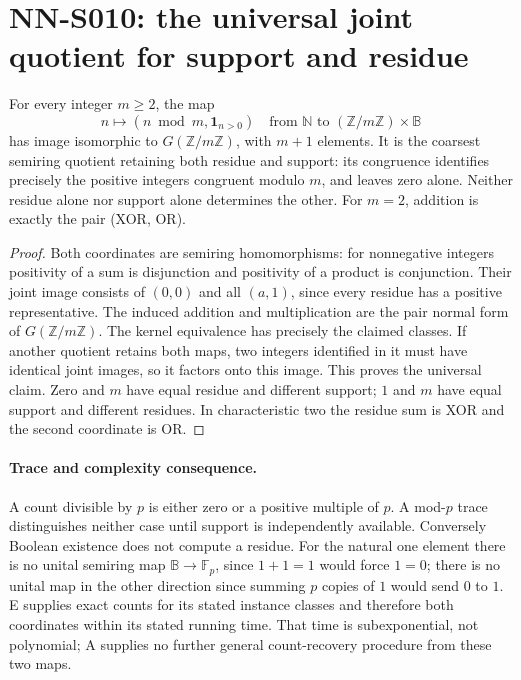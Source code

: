 \section{NN-S010: the universal joint quotient for support and residue}
\label{sec:NN-S010}

\begin{theorem}[NN-S010]
For every integer $m\geq2$, the map
\[
 n\longmapsto(n\bmod m,\mathbf1_{n>0})
 \quad\text{from }\mathbb N\text{ to }(\mathbb Z/m\mathbb Z)\times\mathbb B
\]
has image isomorphic to $G(\mathbb Z/m\mathbb Z)$, with $m+1$
elements. It is the coarsest semiring quotient retaining both
residue and support: its congruence identifies precisely the
positive integers congruent modulo $m$, and leaves zero alone.
Neither residue alone nor support alone determines the other.
For $m=2$, addition is exactly the pair (XOR, OR).
\end{theorem}

\begin{proof}
Both coordinates are semiring homomorphisms: for nonnegative
integers positivity of a sum is disjunction and positivity of a
product is conjunction. Their joint image consists of $(0,0)$
and all $(a,1)$, since every residue has a positive representative.
The induced addition and multiplication are the pair normal form
of $G(\mathbb Z/m\mathbb Z)$. The kernel equivalence has precisely
the claimed classes. If another quotient retains both maps, two
integers identified in it must have identical joint images, so
it factors onto this image. This proves the universal claim.
Zero and $m$ have equal residue and different support; $1$ and
$m$ have equal support and different residues. In characteristic
two the residue sum is XOR and the second coordinate is OR.
\end{proof}

\paragraph{Trace and complexity consequence.}
A count divisible by $p$ is either zero or a positive multiple
of $p$. A mod-$p$ trace distinguishes neither case until support
is independently available. Conversely Boolean existence does
not compute a residue. For the natural one element there is
no unital semiring map $\mathbb B\to\mathbb F_p$, since
$1+1=1$ would force $1=0$; there is no unital map in the other
direction since summing $p$ copies of $1$ would send $0$ to $1$.
E supplies exact counts for its stated instance classes and
therefore both coordinates within its stated running time.
That time is subexponential, not polynomial; A supplies no
further general count-recovery procedure from these two maps.

